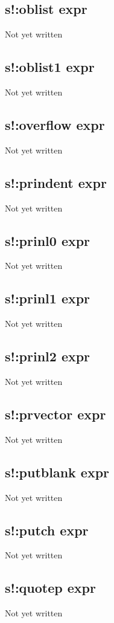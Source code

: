 \documentclass[a4paper,11pt]{article}
\begin{document}
{\subsection{\ttfamily s!:oblist expr}
Not yet written

\subsection{\ttfamily s!:oblist1 expr}
Not yet written

\subsection{\ttfamily s!:overflow expr}
Not yet written

\subsection{\ttfamily s!:prindent expr}
Not yet written

\subsection{\ttfamily s!:prinl0 expr}
Not yet written

\subsection{\ttfamily s!:prinl1 expr}
Not yet written

\subsection{\ttfamily s!:prinl2 expr}
Not yet written

\subsection{\ttfamily s!:prvector expr}
Not yet written

\subsection{\ttfamily s!:putblank expr}
Not yet written

\subsection{\ttfamily s!:putch expr}
Not yet written

\subsection{\ttfamily s!:quotep expr}
Not yet written

}
\end{document}
